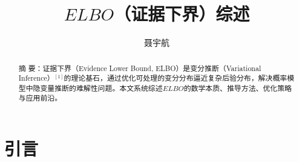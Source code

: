 \documentclass[final]{ws-ijseke}
\begin{document}
%
%
\pagestyle{empty}
\title{$ELBO$（证据下界）综述 }

\author{聂宇航}

\address{信息科学与工程学部, 中国海洋大学, 山东 青岛\\
}


\maketitle


\begin{abstract}
摘  要：证据下界（Evidence Lower Bound, ELBO）是变分推断（Variational Inference）$^{[1]}$的理论基石，通过优化可处理的变分分布逼近复杂后验分布，解决概率模型中隐变量推断的难解性问题。本文系统综述$ELBO$的数学本质、推导方法、优化策略与应用前沿。
\end{abstract}



\section{ 引言 \label{ga}}	%
\end{document}
